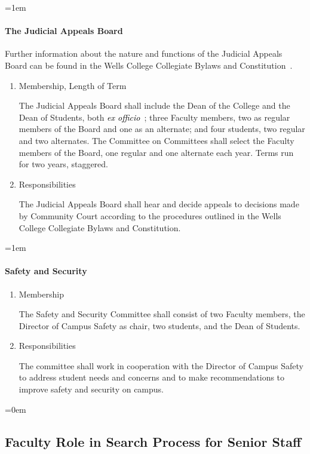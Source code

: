 \documentclass{manual}
\newcommand{\keyword}[1]{\textcolor{black}{#1}}
\newcommand{\constitution}{Wells College Collegiate Bylaws and Constitution~}
\newcommand{\exoff}{\keyword{\textit{ex officio}}~}
\let\oldsubsection\subsection
\renewcommand\subsection{\leftskip=0em\oldsubsection}
\let\oldparagraph\paragraph
\renewcommand\paragraph{\leftskip=1em\oldparagraph}
\newcommand{\itemLevelA}{\alph*.}
\newcommand{\itemRefA}{\alph*}
\begin{document}
\paragraph{The Judicial Appeals Board}

Further information about the nature and functions of the Judicial Appeals Board can be found in the \constitution.
\begin{enumerate}[label=\itemLevelA,ref=\itemRefA]
\item Membership, Length of Term

The Judicial Appeals Board shall include the Dean of the College and the Dean of Students, both \exoff; three Faculty members, two as regular members of the Board and one as an alternate; and four students, two regular and two alternates. The Committee on Committees shall select the Faculty members of the Board, one regular and one alternate each year. Terms run for two years, staggered.

\item Responsibilities

The Judicial Appeals Board shall hear and decide appeals to decisions made by Community Court according to the procedures outlined in the Wells College Collegiate Bylaws and Constitution.

\end{enumerate}

\paragraph{Safety and Security}
\begin{enumerate}[label=\itemLevelA,ref=\itemRefA]
\item Membership

The Safety and Security Committee shall consist of two Faculty members, the Director of Campus Safety as chair, two students, and the Dean of Students.

\item Responsibilities

The committee shall work in cooperation with the Director of Campus Safety to address student needs and concerns and to make recommendations to improve safety and security on campus.

\end{enumerate}

\subsection{Faculty Role in Search Process for Senior Staff}
\end{document}
